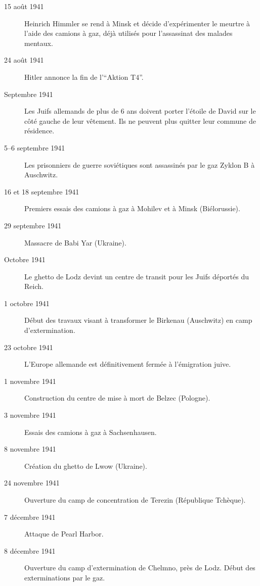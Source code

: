 \begin{description}
    \item[15 août 1941] Heinrich Himmler se rend à Minsk et décide d'expérimenter le meurtre à l'aide des camions à gaz, déjà utilisés pour l'assassinat des malades mentaux.

    \item[24 août 1941] Hitler annonce la fin de l'\enquote{Aktion T4}.
    
    \item[Septembre 1941] Les Juifs allemands de plus de 6 ans doivent porter l'étoile de David sur le côté gauche de leur vêtement. Ils ne peuvent plus quitter leur commune de résidence.

    \item[5--6 septembre 1941] Les prisonniers de guerre soviétiques sont assassinés par le gaz Zyklon B à Auschwitz.

    \item[16 et 18 septembre 1941] Premiers essais des camions à gaz à Mohilev et à Minsk (Biélorussie).

    \item[29 septembre 1941] Massacre de Babi Yar (Ukraine).

    \item[Octobre 1941] Le ghetto de Lodz devint un centre de transit pour les Juifs déportés du Reich.

    \item[1\ier{} octobre 1941] Début des travaux visant à transformer le Birkenau (Auschwitz) en camp d'extermination.

    \item[23 octobre 1941] L'Europe allemande est définitivement fermée à l'émigration juive.

    \item[1\ier{} novembre 1941] Construction du centre de mise à mort de Belzec (Pologne).

    \item[3 novembre 1941] Essais des camions à gaz à Sachsenhausen.

    \item[8 novembre 1941] Création du ghetto de Lwow (Ukraine).

    \item[24 novembre 1941] Ouverture du camp de concentration de Terezin (République Tchèque).

    \item[7 décembre 1941] Attaque de Pearl Harbor.

    \item[8 décembre 1941] Ouverture du camp d'extermination de Chelmno, près de Lodz. Début des exterminations par le gaz.
    

\end{description}
